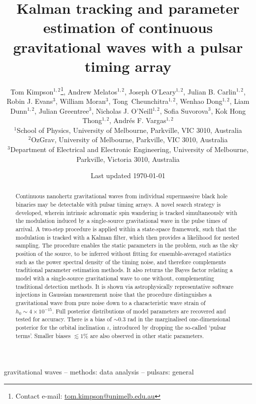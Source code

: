 \documentclass[fleqn,usenatbib,useAMS]{mnras}
\title[Kalman PTA]{Kalman tracking and parameter estimation of continuous gravitational waves with a pulsar timing array}
\author[Kimpson]{Tom Kimpson$^{1,2}$\thanks{Contact e-mail: \href{tom.kimpson@unimelb.edu.au}{tom.kimpson@unimelb.edu.au}}, Andrew Melatos$^{1,2}$, Joseph O'Leary$^{1,2}$, Julian B. Carlin$^{1,2}$, Robin J. Evans$^{3}$, \newauthor William Moran$^{3}$, Tong Cheunchitra$^{1,2}$, Wenhao Dong$^{1,2}$, Liam Dunn$^{1,2}$, Julian Greentree$^{3}$, Nicholas J. O'Neill$^{1,2}$, \newauthor Sofia Suvorova$^{3}$, Kok Hong Thong$^{1,2}$, Andrés F. Vargas$^{1,2}$%
\\
$^{1}$School of Physics, University of Melbourne, Parkville, VIC 3010, Australia \\
$^{2}$OzGrav, University of Melbourne, Parkville, VIC 3010, Australia \\
$^{3}$Department of Electrical and Electronic Engineering, University of Melbourne, Parkville, Victoria 3010, Australia }
\date{Last updated \today}
\begin{document}
\label{firstpage}
\pagerange{\pageref{firstpage}--\pageref{lastpage}}
\maketitle

\begin{abstract}	
Continuous nanohertz gravitational waves from individual supermassive black hole binaries may be detectable with pulsar timing arrays. A novel search strategy is developed, wherein intrinsic achromatic spin wandering is tracked simultaneously with the modulation induced by a single-source gravitational wave in the pulse times of arrival. A two-step procedure is applied within a state-space framework, such that the modulation is tracked with a Kalman filter, which then provides a likelihood for nested sampling. The procedure enables the static parameters in the problem, such as the sky position of the source, to be inferred without fitting for ensemble-averaged statistics such as the power spectral density of the timing noise, and therefore complements traditional parameter estimation methods. It also returns the Bayes factor relating a model with a single-source gravitational wave to one without, complementing traditional detection methods. It is shown via astrophysically representative software injections in Gaussian measurement noise that the procedure distinguishes a gravitational wave from pure noise down to a characteristic wave strain of $h_0 \sim 4 \times 10^{-15}$. Full posterior distributions of model parameters are recovered and tested for accuracy. There is a bias of $\sim 0.3$ rad in the marginalised one-dimensional posterior for the orbital inclination $\iota$, introduced by dropping the so-called `pulsar terms'. Smaller biases $\lesssim 1 \%$ are also observed in other static parameters.
\end{abstract}

\begin{keywords}
gravitational waves -- methods: data analysis -- pulsars: general
\end{keywords}



\begingroup
\let\clearpage\relax
\endgroup
\newpage
\end{document}
